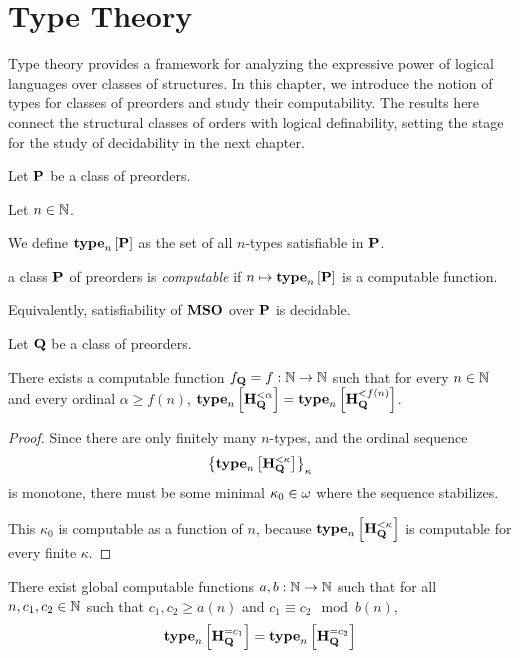 \section{Type Theory}

Type theory provides a framework for analyzing the expressive power of logical languages over classes of structures. In this chapter, we introduce the notion of types for classes of preorders and study their computability. The results here connect the structural classes of orders with logical definability, setting the stage for the study of decidability in the next chapter.

\begin{definition}
    Let $\mathbf{P}$ be a class of preorders.

    Let $n \in \mathbb{N}$.

    We define $\mathbf{type}_{n} \left[ {\mathbf{P}} \right]$ as the set of all
    $n$-types satisfiable in $\mathbf{P}$.
\end{definition}

\begin{definition}
    a class $\mathbf{P}$ of preorders is \emph{computable} if
    $n \mapsto \mathbf{type}_{n} \left[ {\mathbf{P}} \right]$ is a computable function.

    Equivalently, satisfiability of $\mathbf{MSO}$ over $\mathbf{P}$ is decidable.
\end{definition}

\begin{lemma}\label{f-lemma}
    Let $\mathbf{Q}$ be a class of preorders.

    There exists a computable function $f_{\mathbf{Q}} = f: \mathbb{N} \to \mathbb{N}$ such that
    for every $n \in \mathbb{N}$ and every ordinal $\alpha \ge f(n)$,
    $\mathbf{type}_{n} \left[ {\mathbf{H}_{\mathbf{Q}}^{< \alpha}} \right] = \mathbf{type}_{n} \left[ {\mathbf{H}_{\mathbf{Q}}^{< f(n)}} \right]$.
\end{lemma}

\begin{proof}
    Since there are only finitely many $n$-types,
    and the ordinal sequence \[\left\{ {\mathbf{type}_{n} \left[ {\mathbf{H}_{\mathbf{Q}}^{< \kappa}} \right]} \right\}_{\kappa}\]
    is monotone,
    there must be some minimal $\kappa_0 \in \omega$ where the sequence stabilizes.

    This $\kappa_0$ is computable as a function of $n$, because
    $\mathbf{type}_{n} \left[ {\mathbf{H}_{\mathbf{Q}}^{< \kappa}} \right]$ is computable for every finite $\kappa$.
\end{proof}

\begin{lemma}\label{ab-lemma}
    There exist global computable functions $a, b : \mathbb{N} \to \mathbb{N}$ such that
    for all $n, c_1, c_2 \in \mathbb{N}$ such that $c_1, c_2 \ge a(n)$ and $c_1 \equiv c_2 \mod b(n)$,
    \[\mathbf{type}_{n} \left[ {\mathbf{H}_{\mathbf{Q}}^{= c_1}} \right] = \mathbf{type}_{n} \left[ {\mathbf{H}_{\mathbf{Q}}^{= c_2}} \right]\]
\end{lemma}

